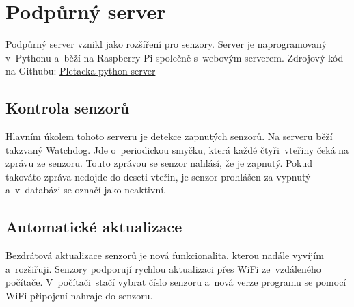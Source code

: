 \chapter{Podpůrný server}
Podpůrný server vznikl jako rozšíření pro senzory.
Server je naprogramovaný v~Pythonu a~běží na Raspberry Pi společně s~webovým serverem.\newline
Zdrojový kód na Githubu: \href{https://github.com/Pletacka-IoT/Pletacka-python-server}{Pletacka-python-server}\cite{PL_PY}


\section{Kontrola senzorů}
Hlavním úkolem tohoto serveru je detekce zapnutých senzorů.
Na serveru běží takzvaný Watchdog.
Jde o~periodickou smyčku, která každé čtyři~vteřiny čeká na zprávu ze senzoru.
Touto zprávou se senzor nahlásí, že je zapnutý. Pokud takováto zpráva nedojde do deseti vteřin, je senzor prohlášen za vypnutý a~v~databázi se označí jako neaktivní.


\section{Automatické aktualizace}
Bezdrátová aktualizace senzorů je nová funkcionalita, kterou nadále vyvíjím a~rozšiřuji.
Senzory podporují rychlou aktualizaci přes WiFi ze~vzdá\-le\-né\-ho počítače.
V~počítači~stačí vybrat číslo senzoru a~nová verze programu se pomocí WiFi připojení nahraje do senzoru.





\newpage